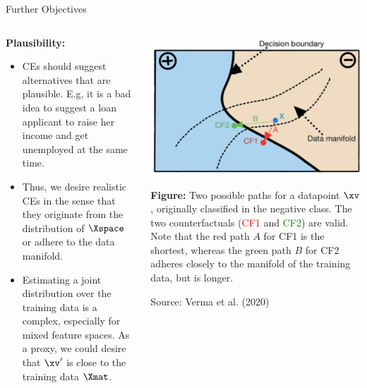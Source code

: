 \documentclass[11pt,compress,t,notes=noshow, xcolor=table]{beamer}
\begin{document}
\begin{vbframe}{Further Objectives}
	\begin{columns}
	\begin{column}{0.55\textwidth}
		\textbf{Plausibility:}
		\begin{itemize}
			\item CEs should suggest alternatives that are plausible. E.g, it is a bad idea to suggest a loan applicant to raise her income and get unemployed at the same time. 
			\item Thus, we desire realistic CEs in the sense that they originate from the distribution of $\Xspace$ or adhere to the data manifold. 
			\item Estimating a joint distribution over the training data is a complex, especially for mixed feature spaces. As a proxy, we could desire that $\xv'$ is close to the training data $\Xmat$. 
		\end{itemize}	
	\end{column}
	\begin{column}{0.4\textwidth}
			\begin{center}
			\includegraphics[width=1\textwidth]{figure/counterfactuals_obj}
		\end{center}
		
		\scriptsize{\textbf{Figure:} Two possible paths for a datapoint \textcolor{blue}{$\xv$},
			originally classified in the negative class. The two counterfactuals (\textcolor{red}{CF1} and \textcolor{green}{CF2}) are valid. Note that the red path $A$ for CF1 is the shortest, whereas the
			green path $B$ for CF2 adheres closely to the manifold of the training data, but is longer.}
		\vspace{0.3cm}
		
		\tiny{Source: Verma et al. (2020)}
		

\end{column}
\end{columns}
\end{vbframe}
\end{document}

